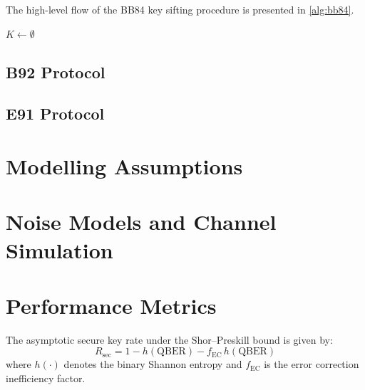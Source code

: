 \documentclass[10pt, a4paper]{report}
\newcommand{\QBER}{\ensuremath{\mathrm{QBER}}}
\newcommand{\keyrate}{\ensuremath{R_{\mathrm{sec}}}}
\begin{document}
The high-level flow of the BB84 key sifting procedure is presented in
\cref{alg:bb84}.

\begin{algorithm}[H]
    \caption{BB84 Key Sifting Procedure}\label{alg:bb84}
    $K \leftarrow \emptyset$\;
\end{algorithm}

\subsection{B92 Protocol}


\subsection{E91 Protocol}


\section{Modelling Assumptions}

\section{Noise Models and Channel Simulation}


\section{Performance Metrics}


The asymptotic secure key rate under the Shor--Preskill bound is given by:
\begin{equation}\label{eq:keyrate}
    \keyrate = 1 - h(\QBER) - f_{\mathrm{EC}}\, h(\QBER)
\end{equation}
where $h(\cdot)$ denotes the binary Shannon entropy and $f_{\mathrm{EC}}$
is the error correction inefficiency factor.
\end{document}
